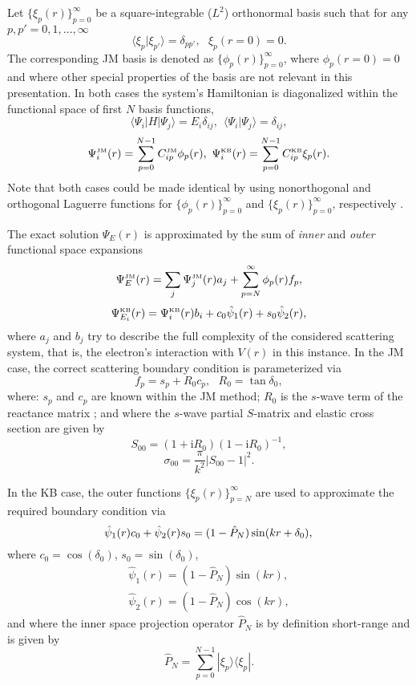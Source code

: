 \documentclass[aip
, pra
, showpacs
, aps
, twocolumn
, groupedaddress
, floatfix
]{revtex4}
\newcommand{\beq}{\begin{equation}}
\newcommand{\eeq}{\end{equation}}
\newcommand{\barr}{\begin{array}}
\newcommand{\earr}{\end{array}}
\newcommand{\JM}{\mbox{\tiny{JM}}}
\newcommand{\KB}{\mbox{\tiny{KB}}}
\begin{document}
Let $\{\xi_p(r)\}_{p=0}^\infty$ be a square-integrable ($L^2$) orthonormal basis
such that
for any $p,p'=0,1,...,\infty$
\beq
\langle \xi_p | \xi_{p'} \rangle=\delta_{pp'}, \ \ \ \xi_p(r=0)=0.
\eeq
The corresponding JM basis is denoted as $\{\phi_p(r)\}_{p=0}^\infty$, where $\phi_p(r=0)=0$
and where other special properties of the basis are not relevant in this presentation.
In both cases the system's Hamiltonian is diagonalized within the functional space of first $N$ basis functions,
\beq
\langle \Psi_i |H| \Psi_j \rangle = E_i \delta_{ij} , \ \ \langle \Psi_i | \Psi_j \rangle=\delta_{ij},
\eeq
\beq
\Psi_i^{\JM}(r) = \sum_{p=0}^{N-1} C_{ip}^{\JM} \phi_p(r), \
\Psi_i^{\KB}(r) = \sum_{p=0}^{N-1} C_{ip}^{\KB} \xi_p(r).
\eeq
Note that both cases could be made identical by using nonorthogonal and orthogonal Laguerre functions for
$\{\phi_p(r)\}_{p=0}^\infty$ and $\{\xi_p(r)\}_{p=0}^\infty$, respectively \cite{KB10p022708}.


The exact solution $\Psi_E(r)$ is approximated by the sum of {\em inner} and {\em outer} functional space expansions
\beq
\Psi_E^{\JM}(r) =\sum_j \Psi_j^{\JM}(r)a_j  + \sum_{p=N}^{\infty} \phi_p(r) f_p,  \label{Psi_JM}
\eeq
\beq
\Psi_{E_i}^{\KB}(r) = \Psi_i^{\KB}(r) b_i  + c_0 \hat{\psi}_1(r)  + s_0 \hat{\psi}_2(r), \label{Psi_KB}
\eeq
where $a_j$ and $b_j$ try to describe the full complexity of the considered scattering system, that is,
the electron's interaction with  $V(r)$ in this instance.
In the JM case, the correct scattering boundary condition is parameterized via
\beq
f_p = s_p + R_0 c_p, \ \ \ R_0 = \tan \delta_0,  \label{R_0}
\eeq
where: $s_p$ and $c_p$  are known within the JM method;
$R_0$ is the $s$-wave term of the reactance matrix \cite{Taylor72};
and where the $s$-wave partial $S$-matrix and elastic cross section are given by
\beq
S_{00}=(1+\mbox{i}R_0)(1-\mbox{i}R_0)^{-1},
\eeq
\beq
\sigma_{00}=\frac{\pi}{k^2} |S_{00}-1|^2.
\eeq


In the KB case, the outer functions $\{\xi_p(r)\}_{p=N}^\infty$ are used to approximate the required boundary condition via
\beq
\hat{\psi}_1(r) c_0 + \hat{\psi}_2(r) s_0 =
(1-\hat{P}_N) \sin(kr + \delta_0),\\
\eeq
where $c_0 = \cos(\delta_0)$, $s_0 = \sin(\delta_0)$,
\beq \barr{l}
\hat{\psi}_1(r) = (1-\hat{P}_N) \sin(kr),\\
\hat{\psi}_2(r) = (1-\hat{P}_N) \cos(kr),
\earr \eeq
and where the inner space projection operator $\hat{P}_N$ is by definition short-range and is given by \\
\beq
\hat{P}_N = \sum_{p=0}^{N-1} | \xi_p \rangle \langle \xi_p |.
\eeq
\end{document}
